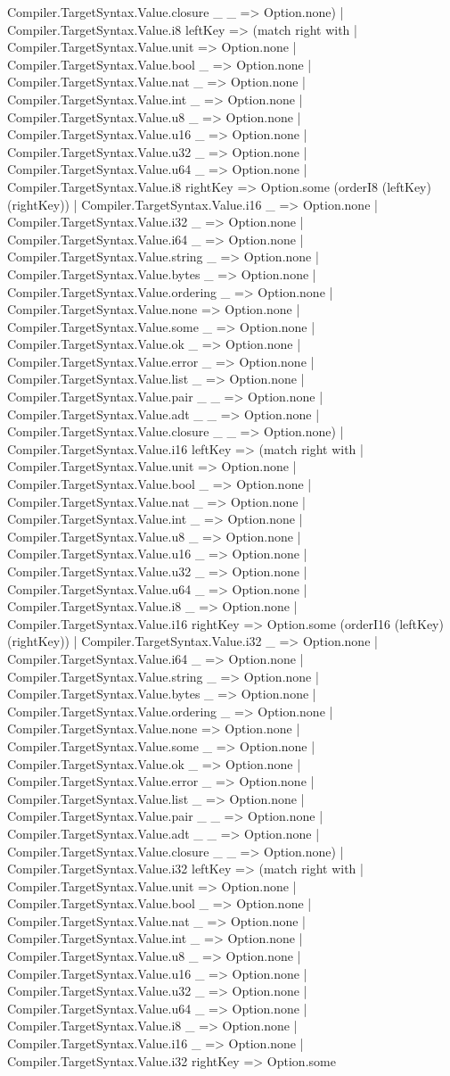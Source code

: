 \documentclass[11pt]{article}
\begin{document}
Compiler.TargetSyntax.Value.closure \_ \_ => Option.none) | Compiler.TargetSyntax.Value.i8 leftKey => (match right with | Compiler.TargetSyntax.Value.unit => Option.none | Compiler.TargetSyntax.Value.bool \_ => Option.none | Compiler.TargetSyntax.Value.nat \_ => Option.none | Compiler.TargetSyntax.Value.int \_ => Option.none | Compiler.TargetSyntax.Value.u8 \_ => Option.none | Compiler.TargetSyntax.Value.u16 \_ => Option.none | Compiler.TargetSyntax.Value.u32 \_ => Option.none | Compiler.TargetSyntax.Value.u64 \_ => Option.none | Compiler.TargetSyntax.Value.i8 rightKey => Option.some (orderI8 (leftKey) (rightKey)) | Compiler.TargetSyntax.Value.i16 \_ => Option.none | Compiler.TargetSyntax.Value.i32 \_ => Option.none | Compiler.TargetSyntax.Value.i64 \_ => Option.none | Compiler.TargetSyntax.Value.string \_ => Option.none | Compiler.TargetSyntax.Value.bytes \_ => Option.none | Compiler.TargetSyntax.Value.ordering \_ => Option.none | Compiler.TargetSyntax.Value.none => Option.none | Compiler.TargetSyntax.Value.some \_ => Option.none | Compiler.TargetSyntax.Value.ok \_ => Option.none | Compiler.TargetSyntax.Value.error \_ => Option.none | Compiler.TargetSyntax.Value.list \_ => Option.none | Compiler.TargetSyntax.Value.pair \_ \_ => Option.none | Compiler.TargetSyntax.Value.adt \_ \_ => Option.none | Compiler.TargetSyntax.Value.closure \_ \_ => Option.none) | Compiler.TargetSyntax.Value.i16 leftKey => (match right with | Compiler.TargetSyntax.Value.unit => Option.none | Compiler.TargetSyntax.Value.bool \_ => Option.none | Compiler.TargetSyntax.Value.nat \_ => Option.none | Compiler.TargetSyntax.Value.int \_ => Option.none | Compiler.TargetSyntax.Value.u8 \_ => Option.none | Compiler.TargetSyntax.Value.u16 \_ => Option.none | Compiler.TargetSyntax.Value.u32 \_ => Option.none | Compiler.TargetSyntax.Value.u64 \_ => Option.none | Compiler.TargetSyntax.Value.i8 \_ => Option.none | Compiler.TargetSyntax.Value.i16 rightKey => Option.some (orderI16 (leftKey) (rightKey)) | Compiler.TargetSyntax.Value.i32 \_ => Option.none | Compiler.TargetSyntax.Value.i64 \_ => Option.none | Compiler.TargetSyntax.Value.string \_ => Option.none | Compiler.TargetSyntax.Value.bytes \_ => Option.none | Compiler.TargetSyntax.Value.ordering \_ => Option.none | Compiler.TargetSyntax.Value.none => Option.none | Compiler.TargetSyntax.Value.some \_ => Option.none | Compiler.TargetSyntax.Value.ok \_ => Option.none | Compiler.TargetSyntax.Value.error \_ => Option.none | Compiler.TargetSyntax.Value.list \_ => Option.none | Compiler.TargetSyntax.Value.pair \_ \_ => Option.none | Compiler.TargetSyntax.Value.adt \_ \_ => Option.none | Compiler.TargetSyntax.Value.closure \_ \_ => Option.none) | Compiler.TargetSyntax.Value.i32 leftKey => (match right with | Compiler.TargetSyntax.Value.unit => Option.none | Compiler.TargetSyntax.Value.bool \_ => Option.none | Compiler.TargetSyntax.Value.nat \_ => Option.none | Compiler.TargetSyntax.Value.int \_ => Option.none | Compiler.TargetSyntax.Value.u8 \_ => Option.none | Compiler.TargetSyntax.Value.u16 \_ => Option.none | Compiler.TargetSyntax.Value.u32 \_ => Option.none | Compiler.TargetSyntax.Value.u64 \_ => Option.none | Compiler.TargetSyntax.Value.i8 \_ => Option.none | Compiler.TargetSyntax.Value.i16 \_ => Option.none | Compiler.TargetSyntax.Value.i32 rightKey => Option.some 
\end{document}
